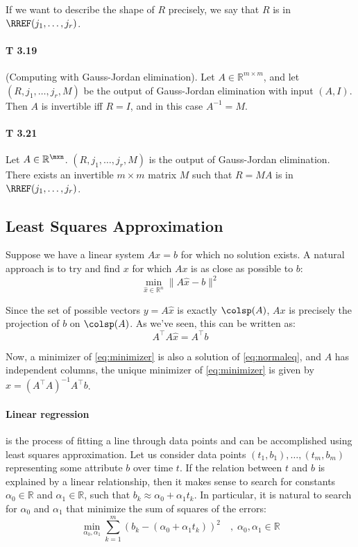 If we want to describe the shape of $R$ precisely, we say that $R$ is in
$\RREF(j_1,\dots,j_r)$.

\paragraph{T 3.19} (Computing  with Gauss-Jordan elimination). Let $A\in\mathbb{R}^{m\times m}$, and let $(R,j_1,\dots,j_r, M)$ be the output of Gauss-Jordan elimination with input $(A,I)$. Then $A$ is invertible iff $R=I$, and in this case $A^{-1}=M$.

\paragraph{T 3.21} Let $A\in\mathbb{R}^{\mxn}$. $(R,j_1,\dots,j_r, M)$ is the output of Gauss-Jordan elimination. There exists an invertible $m\times m$ matrix $M$ such that $R=MA$ is in $\RREF(j_1,\dots,j_r)$.

\subsection{Least Squares Approximation}

Suppose we have a linear system $Ax=b$ for which no solution
exists. A natural approach is to try and find $x$ for which $Ax$ is
as close as possible to $b$:
\begin{equation}
    \min_{\hat{x}\in\mathbb{R}^n}{\lVert A\hat{x}-b\rVert^2}
    \label{eq:minimizer}
\end{equation}

Since the set of possible vectors $y=A\hat{x}$ is exactly $\colsp(A)$,
$Ax$ is precisely the projection of $b$ on $\colsp(A)$. As we've
seen, this can be written as:
\begin{equation}
    A^\top A\hat{x}=A^\top b
    \label{eq:normaleq}
\end{equation}

Now, a minimizer of \eqref{eq:minimizer} is also a solution of
\eqref{eq:normaleq}, and $A$ has independent columns, the unique minimizer of
\eqref{eq:minimizer} is given by $\hat{x}=(A^\top A)^{-1}A^\top b$.

\paragraph{Linear regression} is the process of fitting a line through data
points and can be accomplished using least squares approximation. Let us
consider data points $(t_1,b_1),\dots,(t_m,b_m)$ representing some attribute
$b$ over time $t$. If the relation between $t$ and $b$ is explained by a linear
relationship, then it makes sense to search for constants
$\alpha_0\in\mathbb{R}$ and $\alpha_1\in\mathbb{R}$, such that $b_k\approx
\alpha_0+\alpha_1 t_k$. In particular, it is natural to search for $\alpha_0$
and $\alpha_1$ that minimize the sum of squares of the errors:
\begin{equation}
    \min_{\alpha_0,\alpha_1}\sum_{k=1}^{m}(b_k-(\alpha_0+\alpha_1 t_k))^2 \quad,\; \alpha_0, \alpha_1\in\mathbb{R}
    \label{eq:linregorig}
\end{equation}

